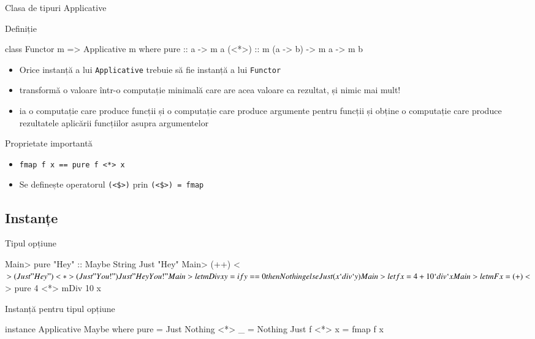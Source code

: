 \documentclass[xcolor=pdftex,romanian,colorlinks]{beamer}
\begin{document}
\begin{frame}[fragile]{Clasa de tipuri Applicative}
\begin{block}{Definiție}{}
\vspace{-2ex}
\begin{asciihs}
class Functor m => Applicative m where
   pure :: a -> m a
  (<*>) :: m (a -> b) -> m a -> m b
\end{asciihs}

\begin{itemize}
\item Orice instanță a lui \lstinline$Applicative$ trebuie să fie instanță a lui \lstinline$Functor$
\item {} transformă o valoare într-o computație minimală care are acea valoare ca rezultat, și nimic mai mult!
\item \structure{\lstinline$(<*>)$} ia o computație care produce funcții și o computație care produce argumente pentru funcții și obține  o computație care produce rezultatele aplicării funcțiilor asupra argumentelor
\end{itemize}
\end{block}

\begin{block}{Proprietate importantă}
\begin{itemize}
\item \lstinline$fmap f x == pure f <*> x$

\item Se definește operatorul \lstinline"(<$>)" prin  \lstinline"(<$>) = fmap"
\end{itemize}
\end{block}

\end{frame}


\subsection{Instanțe}

\begin{frame}[fragile]{Tipul opțiune}
\begin{asciihs}
Main> pure "Hey" :: Maybe String
Just "Hey"
Main> (++) <$> (Just "Hey ") <*> (Just "You!")
Just "Hey You!"
Main> let mDiv x y = if y == 0 then Nothing else Just (x `div` y)
Main> let f x = 4 + 10 `div` x
Main> let mF x = (+) <$> pure 4 <*> mDiv 10 x
\end{asciihs}

\begin{block}{Instanță pentru tipul opțiune}
\vspace{-2ex}
\begin{asciihs}
instance Applicative Maybe where
  pure = Just
  Nothing <*> _ = Nothing
  Just f  <*> x = fmap f x
\end{asciihs}
\end{block}
\end{frame}
\end{document}
